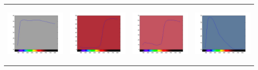 \begin{tabular}{  c c c c }
\includegraphics[width=3.0cm,height=3.0cm]{ColorPaper/ch13.jpg}
&
\includegraphics[width=3.0cm,height=3.0cm]{ColorPaper/ch14.jpg}
&
\includegraphics[width=3.0cm,height=3.0cm]{ColorPaper/ch15.jpg}
&
\includegraphics[width=3.0cm,height=3.0cm]{ColorPaper/ch16.jpg}
\\


\end{tabular}
